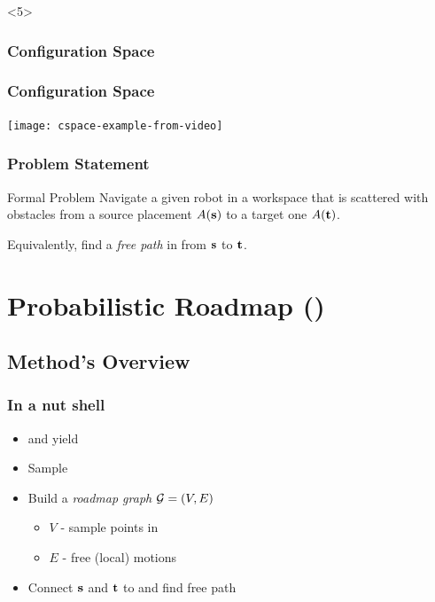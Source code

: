 \documentclass{beamer}
\begin{document}
\begin{frame}<5>
  \frametitle{Configuration Space}
  \begin{example}
    \begin{center}
      
    \end{center}
  \end{example}
\end{frame}

\begin{frame}
  \frametitle{Configuration Space}
  \begin{example}
    \begin{center}
      \texttt{[image: cspace-example-from-video]}
    \end{center}
  \end{example}
\end{frame}

\begin{frame}
  \frametitle{Problem Statement}
  \begin{block}{Formal Problem}
    Navigate a given robot \robot{} in a workspace \wspace{} that is scattered with obstacles \obst{} from a source placement \(\robot(\cp{s})\) to a target one \(\robot(\cp{t})\).

    Equivalently, find a \emph{free path} in \cspace{} from \(\cp{s}\) to \(\cp{t}\).
  \end{block}
\end{frame}

\section[PRM]{Probabilistic Roadmap (\cite{Ka96})}
\subsection*{Method's Overview}
\begin{frame}[label=prm-overview]
  \frametitle{In a nut shell}
  \begin{itemize} %
  \item \robot{} and \wspace{} yield \cspace{}
  \item Sample \cfree{}
  \item Build a \emph{roadmap graph} \(\mathcal{G}{} = \left( V,E \right)\)
    \begin{itemize}
    \item \(V\) - sample points in \cfree{}
    \item \(E\) - free (local) motions
    \end{itemize}
  \item Connect \(\cp{s}\) and \(\cp{t}\) to \roadmap{} and find free path
  \end{itemize}
\end{frame}
\end{document}
